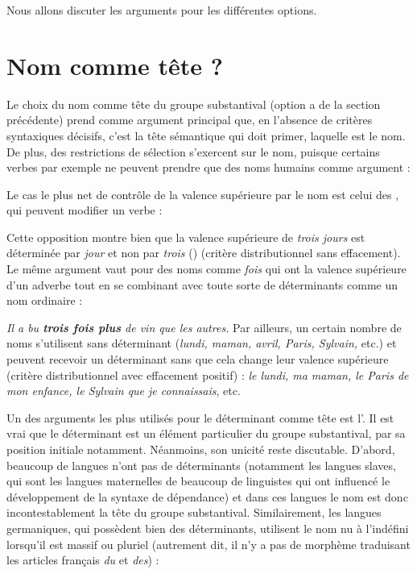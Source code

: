 Nous allons discuter les arguments pour les différentes options.

\section{Nom comme tête ?}\label{sec:3.3.24}

Le choix du nom comme tête du groupe substantival (option a de la section précédente) prend comme argument principal que, en l’absence de critères syntaxiques décisifs, c’est la tête sémantique qui doit primer, laquelle est le nom. De plus, des restrictions de sélection s’exercent sur le nom, puisque certains verbes par exemple ne peuvent prendre que des noms humains comme argument :

\ea{}
\z
\z
Le cas le plus net de contrôle de la valence supérieure par le nom est celui des , qui peuvent modifier un verbe :

\ea
  \z
\z
Cette opposition montre bien que la valence supérieure de \textit{trois jours} est déterminée par \textit{jour} et non par \textit{trois} (\citealt{langendonck1994determiners}) (critère distributionnel sans effacement). Le même argument vaut pour des noms comme \textit{fois} qui ont la valence supérieure d’un adverbe tout en se combinant avec toute sorte de déterminants comme un nom ordinaire :

\ea
    \textit{{Il a bu} \textbf{{trois fois plus}} {de vin que les autres}.}
\z
Par ailleurs, un certain nombre de noms s’utilisent sans déterminant (\textit{lundi, maman, avril, Paris, Sylvain,} etc.) et peuvent recevoir un déterminant sans que cela change leur valence supérieure (critère distributionnel avec effacement positif) : \textit{le lundi, ma maman, le Paris de mon enfance, le Sylvain que je connaissais}, etc.

Un des arguments les plus utilisés pour le déterminant comme tête est l’. Il est vrai que le déterminant est un élément particulier du groupe substantival, par sa position initiale notamment. Néanmoins, son unicité reste discutable. D’abord, beaucoup de langues n’ont pas de déterminants (notamment les langues slaves, qui sont les langues maternelles de beaucoup de linguistes qui ont influencé le développement de la syntaxe de dépendance) et dans ces langues le nom est donc incontestablement la tête du groupe substantival. Similairement, les langues germaniques, qui possèdent bien des déterminants, utilisent le nom nu à l’indéfini lorsqu’il est massif ou pluriel (autrement dit, il n’y a pas de morphème traduisant les articles français \textit{du} et \textit{des}) :

